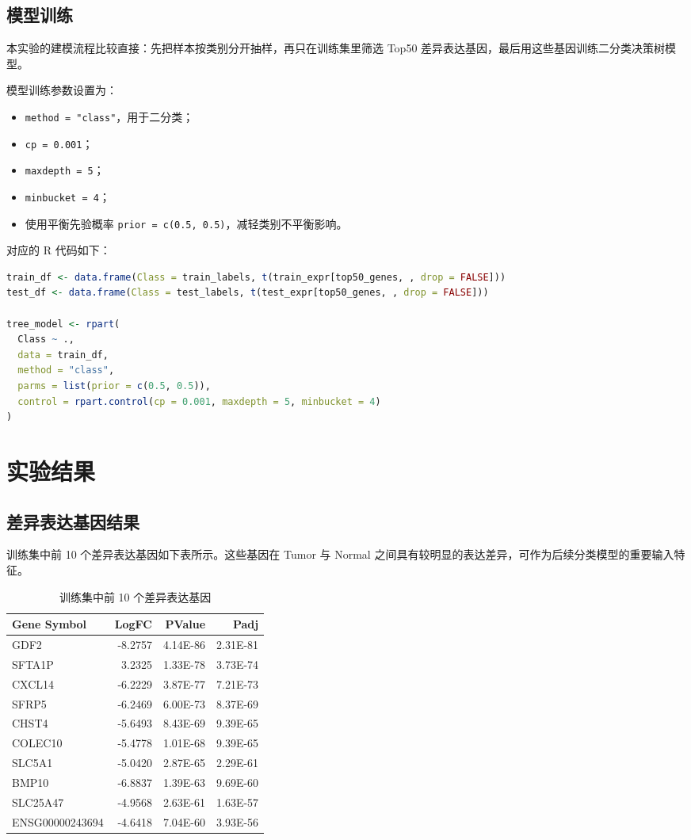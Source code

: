 \documentclass[12pt,fontset=fandol]{ctexart}
\begin{document}
\subsection{模型训练}
本实验的建模流程比较直接：先把样本按类别分开抽样，再只在训练集里筛选 Top50 差异表达基因，最后用这些基因训练二分类决策树模型。

模型训练参数设置为：
\begin{itemize}
  \item \texttt{method = "class"}，用于二分类；
  \item \texttt{cp = 0.001}；
  \item \texttt{maxdepth = 5}；
  \item \texttt{minbucket = 4}；
  \item 使用平衡先验概率 \texttt{prior = c(0.5, 0.5)}，减轻类别不平衡影响。
\end{itemize}

对应的 R 代码如下：
\begin{lstlisting}[language=R]
train_df <- data.frame(Class = train_labels, t(train_expr[top50_genes, , drop = FALSE]))
test_df <- data.frame(Class = test_labels, t(test_expr[top50_genes, , drop = FALSE]))

tree_model <- rpart(
  Class ~ .,
  data = train_df,
  method = "class",
  parms = list(prior = c(0.5, 0.5)),
  control = rpart.control(cp = 0.001, maxdepth = 5, minbucket = 4)
)
\end{lstlisting}

\section{实验结果}
\subsection{差异表达基因结果}
训练集中前 10 个差异表达基因如下表所示。这些基因在 Tumor 与 Normal 之间具有较明显的表达差异，可作为后续分类模型的重要输入特征。

\begin{table}[H]
\centering
\caption{训练集中前 10 个差异表达基因}
\begin{tabular}{lrrr}
\toprule
Gene Symbol & LogFC & PValue & Padj \\
\midrule
GDF2 & -8.2757 & 4.14E-86 & 2.31E-81 \\
SFTA1P & 3.2325 & 1.33E-78 & 3.73E-74 \\
CXCL14 & -6.2229 & 3.87E-77 & 7.21E-73 \\
SFRP5 & -6.2469 & 6.00E-73 & 8.37E-69 \\
CHST4 & -5.6493 & 8.43E-69 & 9.39E-65 \\
COLEC10 & -5.4778 & 1.01E-68 & 9.39E-65 \\
SLC5A1 & -5.0420 & 2.87E-65 & 2.29E-61 \\
BMP10 & -6.8837 & 1.39E-63 & 9.69E-60 \\
SLC25A47 & -4.9568 & 2.63E-61 & 1.63E-57 \\
ENSG00000243694 & -4.6418 & 7.04E-60 & 3.93E-56 \\
\bottomrule
\end{tabular}
\end{table}
\end{document}
